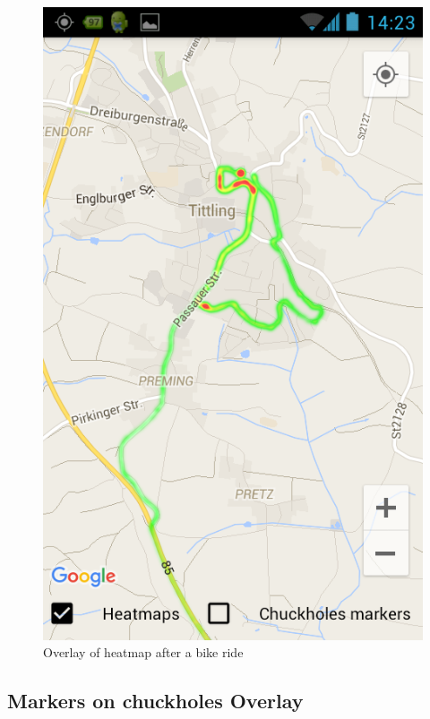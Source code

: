 \documentclass[10pt,a4paper]{article} %
\begin{document}
    \begin{figure}[H]
    \centering
	   
       \includegraphics[scale = 0.31]{pic4}
       \caption{Overlay of heatmap after a bike ride}
		  \label{fig:heatmap_overlay}
       
    \end{figure}
    
    
    
    
    
    \subsection{ Markers on chuckholes Overlay}
    
\end{document}

